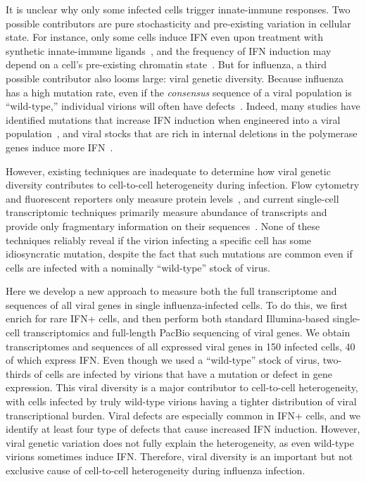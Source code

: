 \documentclass[9pt,lineno]{elife}
\begin{document}
It is unclear why only some infected cells trigger innate-immune responses.
Two possible contributors are pure stochasticity and pre-existing variation in cellular state.
For instance, only some cells induce IFN even upon treatment with synthetic innate-immune ligands~\citep{shalek2013single, shalek2014single, wimmers2018single}, and the frequency of IFN induction may depend on a cell's pre-existing chromatin state~\citep{bhushal2017cell}.
But for influenza, a third possible contributor also looms large: viral genetic diversity.
Because influenza has a high mutation rate, even if the \emph{consensus} sequence of a viral population is ``wild-type,'' individual virions will often have defects~\citep{parvin1986measurement, suarez1992heterogeneity, suarez1994estimation, bloom2014experimentally, pauly2017novel}.
Indeed, many studies have identified mutations that increase IFN induction when engineered into a viral population~\citep{velthuis2018mini, du2018genome, killip2017single, perez2014unbiased}, and viral stocks that are rich in internal deletions in the polymerase genes induce more IFN~\citep{baum2010preference, tapia2013defective, boergeling2015evidence, dimmock2015cloned}.

However, existing techniques are inadequate to determine how viral genetic diversity contributes to cell-to-cell heterogeneity during infection.
Flow cytometry and fluorescent reporters only measure protein levels~\citep{brooke2013most, guo2017single}, and current single-cell transcriptomic techniques primarily measure abundance of transcripts and provide only fragmentary information on their sequences~\citep{russell2018extreme, zanini2018single, zanini2018virus, steuerman2018dissection, saikia2018simultaneous}.
None of these techniques reliably reveal if the virion infecting a specific cell has some idiosyncratic mutation, despite the fact that such mutations are common even if cells are infected with a nominally ``wild-type'' stock of virus.

Here we develop a new approach to measure both the full transcriptome and sequences of all viral genes in single influenza-infected cells.
To do this, we first enrich for rare IFN+ cells, and then perform both standard Illumina-based single-cell transcriptomics and full-length PacBio sequencing of viral genes.
We obtain transcriptomes and sequences of all expressed viral genes in 150 infected cells, 40 of which express IFN.
Even though we used a ``wild-type'' stock of virus, two-thirds of cells are infected by virions that have a mutation or defect in gene expression.
This viral diversity is a major contributor to cell-to-cell heterogeneity, with cells infected by truly wild-type virions having a tighter distribution of viral transcriptional burden.
Viral defects are especially common in IFN+ cells, and we identify at least four type of defects that cause increased IFN induction.
However, viral genetic variation does not fully explain the heterogeneity, as even wild-type virions sometimes induce IFN.
Therefore, viral diversity is an important but not exclusive cause of cell-to-cell heterogeneity during influenza infection.
\end{document}
